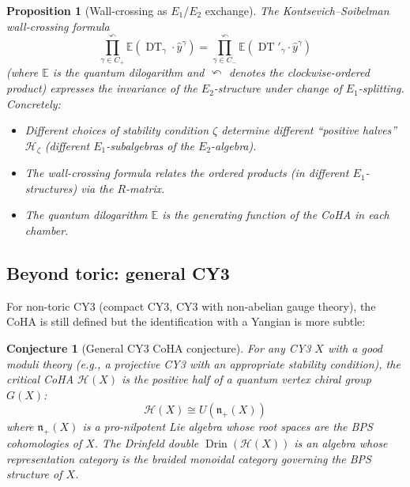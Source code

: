 \documentclass[11pt]{article}
\newtheorem{proposition}[theorem]{Proposition}
\newtheorem{conjecture}[theorem]{Conjecture}
\theoremstyle{definition}
\theoremstyle{remark}
\newcommand{\CoHA}{\mathcal{H}}
\newcommand{\frakn}{\mathfrak{n}}
\newcommand{\DT}{\operatorname{DT}}
\begin{document}
\begin{proposition}[Wall-crossing as $E_1$/$E_2$ exchange]
\label{prop:wall-crossing}
The Kontsevich--Soibelman wall-crossing formula
\[
 \prod_{\gamma \in C_+}^{\curvearrowleft}
 \mathbb{E}(\DT_\gamma \cdot \hat{y}^\gamma)
 =
 \prod_{\gamma \in C_-}^{\curvearrowleft}
 \mathbb{E}(\DT'_\gamma \cdot \hat{y}^\gamma)
\]
(where $\mathbb{E}$ is the quantum dilogarithm and $\curvearrowleft$ denotes
the clockwise-ordered product) expresses the invariance of the $E_2$-structure
under change of $E_1$-splitting. Concretely:
\begin{itemize}
 \item Different choices of stability condition $\zeta$ determine different
 ``positive halves'' $\CoHA_\zeta$ (different $E_1$-subalgebras of the
 $E_2$-algebra).
 \item The wall-crossing formula relates the ordered products (in different
 $E_1$-structures) via the $R$-matrix.
 \item The quantum dilogarithm $\mathbb{E}$ is the generating function of
 the CoHA in each chamber.
\end{itemize}
\end{proposition}


\subsection{Beyond toric: general CY3}
\label{subsec:beyond-toric}

For non-toric CY3 (compact CY3, CY3 with non-abelian gauge theory), the
CoHA is still defined but the identification with a Yangian is more subtle:

\begin{conjecture}[General CY3 CoHA conjecture]
\label{conj:general-cy3}
For any CY3 $X$ with a good moduli theory (e.g., a projective CY3 with an
appropriate stability condition), the critical CoHA $\CoHA(X)$ is the positive
half of a quantum vertex chiral group $G(X)$:
\[
 \CoHA(X) \cong U(\frakn_+(X))
\]
where $\frakn_+(X)$ is a pro-nilpotent Lie algebra whose root spaces are the
BPS cohomologies of $X$. The Drinfeld double $\operatorname{Drin}(\CoHA(X))$
is an algebra whose representation category is the braided monoidal category
governing the BPS structure of $X$.
\end{conjecture}
\end{document}
